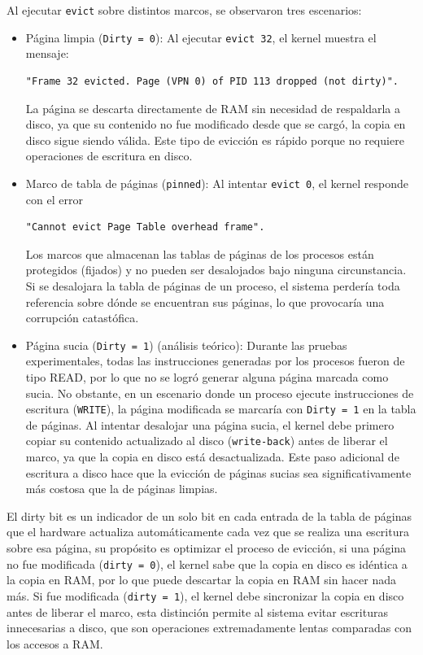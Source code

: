 \documentclass[12pt,letterpaper]{article}
\begin{document}
Al ejecutar \texttt{evict} sobre distintos marcos, se observaron tres escenarios:
\begin{itemize}
\item Página limpia (\texttt{Dirty = 0}): Al ejecutar \texttt{evict 32}, el kernel muestra el mensaje:
  
\begin{Verbatim}[formatcom=\color{orgcolor}]
"Frame 32 evicted. Page (VPN 0) of PID 113 dropped (not dirty)".
\end{Verbatim}
  
La página se descarta directamente de RAM sin necesidad de respaldarla a disco, ya que su contenido no fue
modificado desde que se cargó, la copia en disco sigue siendo válida. Este tipo de evicción es rápido porque no
requiere operaciones de escritura en disco.

\item Marco de tabla de páginas (\texttt{pinned}): Al intentar \texttt{evict 0}, el kernel responde con el error
  
\begin{Verbatim}[formatcom=\color{orgcolor}]
"Cannot evict Page Table overhead frame".
\end{Verbatim}

Los marcos que almacenan las tablas de páginas de los procesos están protegidos (fijados) y no pueden ser
desalojados bajo ninguna circunstancia. Si se desalojara la tabla de páginas de un proceso, el sistema perdería
toda referencia sobre dónde se encuentran sus páginas, lo que provocaría una corrupción catastófica.
  
\item Página sucia (\texttt{Dirty = 1}) (análisis teórico): Durante las pruebas experimentales, todas las
  instrucciones generadas por los procesos fueron de tipo READ, por lo que no se logró generar alguna página
  marcada como sucia. No obstante, en un escenario donde un proceso ejecute instrucciones de escritura
  (\texttt{WRITE}), la página modificada se marcaría con \texttt{Dirty = 1} en la tabla de páginas. Al intentar
  desalojar una página sucia, el kernel debe primero copiar su contenido actualizado al disco
  (\texttt{write-back}) antes de liberar el marco, ya que la copia en disco está desactualizada. Este paso
  adicional de escritura a disco hace que la evicción de páginas sucias sea significativamente más costosa que
  la de páginas limpias.
\end{itemize}

El dirty bit es un indicador de un solo bit en cada entrada de la tabla de páginas que el hardware actualiza
automáticamente cada vez que se realiza una escritura sobre esa página, su propósito es optimizar el proceso de
evicción, si una página no fue modificada (\texttt{dirty = 0}), el kernel sabe que la copia en disco es
idéntica a la copia en RAM, por lo que puede descartar la copia en RAM sin hacer nada más. Si fue modificada
(\texttt{dirty = 1}), el kernel debe sincronizar la copia en disco antes de liberar el marco, esta distinción
permite al sistema evitar escrituras innecesarias a disco, que son operaciones extremadamente lentas comparadas
con los accesos a RAM.
\end{document}
